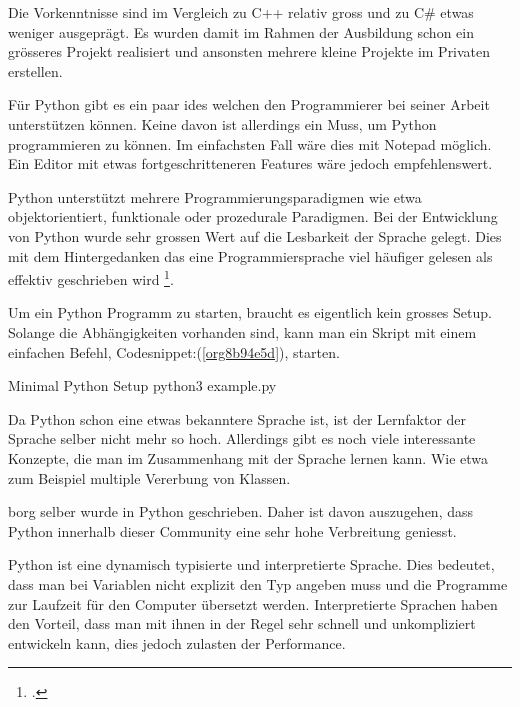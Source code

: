 Die Vorkenntnisse sind im Vergleich zu C++ relativ gross und zu C\# etwas
weniger ausgeprägt. Es wurden damit im Rahmen der Ausbildung schon ein
grösseres Projekt realisiert und ansonsten mehrere kleine Projekte im Privaten
erstellen.

Für Python gibt es ein paar \glspl{ide} welchen den Programmierer bei seiner
Arbeit unterstützen können. Keine davon ist allerdings ein Muss, um Python
programmieren zu können. Im einfachsten Fall wäre dies mit Notepad möglich. Ein
Editor mit etwas fortgeschritteneren Features wäre jedoch empfehlenswert.

Python unterstützt mehrere Programmierungsparadigmen wie etwa
objektorientiert, funktionale oder prozedurale Paradigmen. Bei der Entwicklung
von Python wurde sehr grossen Wert auf die Lesbarkeit der Sprache gelegt. Dies
mit dem Hintergedanken das eine Programmiersprache viel häufiger gelesen als
effektiv geschrieben wird \footcite{pep8}.

Um ein Python Programm zu starten, braucht es eigentlich kein grosses Setup.
Solange die Abhängigkeiten vorhanden sind, kann man ein Skript mit einem
einfachen Befehl, Codesnippet:(\ref{org8b94e5d}), starten.

\begin{sexylisting}[label=org8b94e5d]{Minimal Python Setup}
python3 example.py
\end{sexylisting}

Da Python schon eine etwas bekanntere Sprache ist, ist der Lernfaktor der
Sprache selber nicht mehr so hoch. Allerdings gibt es noch viele interessante
Konzepte, die man im Zusammenhang mit der Sprache lernen kann. Wie etwa zum
Beispiel multiple Vererbung von Klassen.

\gls{borg} selber wurde in Python geschrieben. Daher ist davon auszugehen, dass
Python innerhalb dieser Community eine sehr hohe Verbreitung geniesst.

Python ist eine dynamisch typisierte und interpretierte Sprache. Dies bedeutet,
dass man bei Variablen nicht explizit den Typ angeben muss und die Programme zur
Laufzeit für den Computer übersetzt werden. Interpretierte Sprachen haben den
Vorteil, dass man mit ihnen in der Regel sehr schnell und unkompliziert
entwickeln kann, dies jedoch zulasten der Performance.

